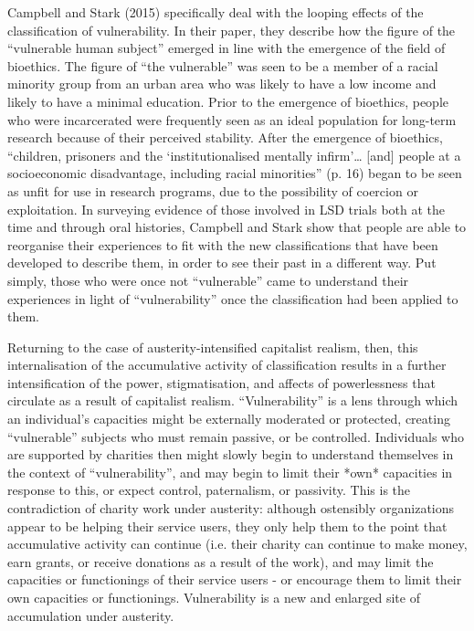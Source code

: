 Campbell and Stark (2015) specifically deal with the looping effects of
the classification of vulnerability. In their paper, they describe how
the figure of the ``vulnerable human subject'' emerged in line with the
emergence of the field of bioethics. The figure of ``the vulnerable''
was seen to be a member of a racial minority group from an urban area
who was likely to have a low income and likely to have a minimal
education. Prior to the emergence of bioethics, people who were
incarcerated were frequently seen as an ideal population for long-term
research because of their perceived stability. After the emergence of
bioethics, ``children, prisoners and the `institutionalised mentally
infirm'\ldots{} {[}and{]} people at a socioeconomic disadvantage,
including racial minorities'' (p. 16) began to be seen as unfit for use
in research programs, due to the possibility of coercion or
exploitation. In surveying evidence of those involved in LSD trials both
at the time and through oral histories, Campbell and Stark show that
people are able to reorganise their experiences to fit with the new
classifications that have been developed to describe them, in order to
see their past in a different way. Put simply, those who were once not
``vulnerable'' came to understand their experiences in light of
``vulnerability'' once the classification had been applied to them.

Returning to the case of austerity-intensified capitalist realism, then,
this internalisation of the accumulative activity of classification
results in a further intensification of the power, stigmatisation, and
affects of powerlessness that circulate as a result of capitalist
realism. ``Vulnerability'' is a lens through which an individual's
capacities might be externally moderated or protected, creating
``vulnerable'' subjects who must remain passive, or be controlled.
Individuals who are supported by charities then might slowly begin to
understand themselves in the context of ``vulnerability'', and may begin
to limit their *own* capacities in response to this, or expect control,
paternalism, or passivity. This is the contradiction of charity work
under austerity: although ostensibly organizations appear to be helping
their service users, they only help them to the point that accumulative
activity can continue (i.e. their charity can continue to make money,
earn grants, or receive donations as a result of the work), and may
limit the capacities or functionings of their service users - or
encourage them to limit their own capacities or functionings.
Vulnerability is a new and enlarged site of accumulation under
austerity.

